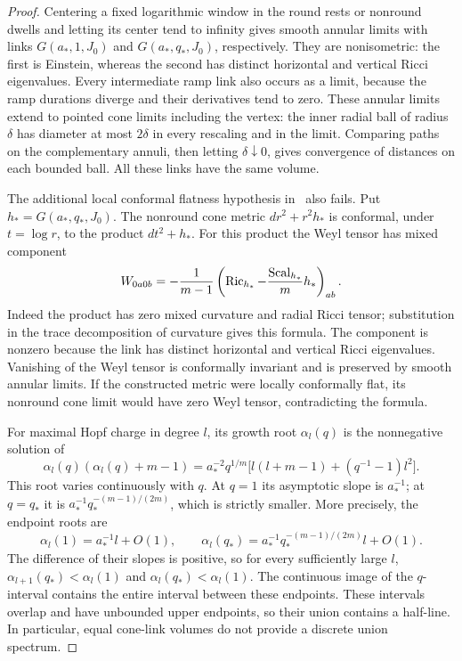 \begin{proof}
 Centering a fixed
logarithmic window in the round rests or nonround dwells and letting its
center tend to infinity gives smooth annular limits with links
$G(a_*,1,J_0)$ and $G(a_*,q_*,J_0)$, respectively. They are nonisometric:
the first is Einstein, whereas the second has distinct horizontal and
vertical Ricci eigenvalues. Every intermediate ramp link also occurs as a
limit, because the ramp durations diverge and their derivatives tend to
zero. These annular limits extend to pointed cone limits including the
vertex: the inner radial ball of radius $\delta$ has diameter at most
$2\delta$ in every rescaling and in the limit. Comparing paths on the
complementary annuli, then letting $\delta\downarrow0$, gives convergence
of distances on each bounded ball. All these links have the same volume.

The additional local conformal flatness hypothesis in~\cite{CaiLai}
also fails.  Put \(h_*=G(a_*,q_*,J_0)\).
The nonround cone metric \(dr^2+r^2h_*\) is conformal, under
\(t=\log r\), to the product \(dt^2+h_*\).
For this product the Weyl tensor has mixed component
\[
 W_{0a0b}
 =-\frac{1}{m-1}
   \left(\operatorname{Ric}_{h_*}-\frac{\operatorname{Scal}_{h_*}}{m}h_*\right)_{ab}.
\]
Indeed the product has zero mixed curvature and radial Ricci tensor;
substitution in the trace decomposition of curvature gives this formula.
The component is nonzero because the link has distinct horizontal and
vertical Ricci eigenvalues.  Vanishing of the Weyl tensor is conformally
invariant and is preserved by smooth annular limits.  If the constructed
metric were locally conformally flat, its nonround cone limit would have
zero Weyl tensor, contradicting the formula.

For maximal Hopf charge in degree $l$, its
growth root $\alpha_l(q)$ is the nonnegative solution of
\[
 \alpha_l(q)(\alpha_l(q)+m-1)
 =a_*^{-2}q^{1/m}
   \bigl[l(l+m-1)+(q^{-1}-1)l^2\bigr].
\]
This root varies continuously with $q$. At $q=1$ its asymptotic slope is
$a_*^{-1}$; at $q=q_*$ it is
$a_*^{-1}q_*^{-(m-1)/(2m)}$, which is strictly smaller. More precisely, the endpoint roots are
\[
 \alpha_l(1)=a_*^{-1}l+O(1),\qquad
 \alpha_l(q_*)=a_*^{-1}q_*^{-(m-1)/(2m)}l+O(1).
\]
The difference of their slopes is positive, so for every sufficiently
large \(l\), \(\alpha_{l+1}(q_*)<\alpha_l(1)\) and
\(\alpha_l(q_*)<\alpha_l(1)\). The continuous image of the
\(q\)-interval contains the entire interval between these endpoints.
These intervals overlap and have unbounded upper endpoints, so their
union contains a half-line. In particular, equal cone-link
volumes do not provide a discrete union spectrum.


\end{proof}
